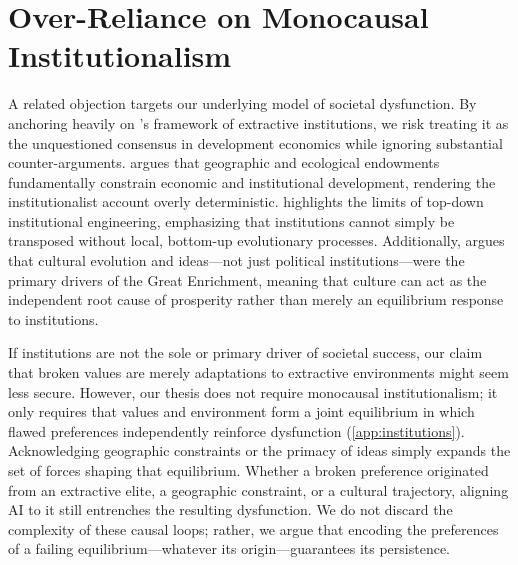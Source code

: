 \documentclass{article}
\theoremstyle{plain}
\theoremstyle{definition}
\theoremstyle{remark}
\begin{document}
\section{Over-Reliance on Monocausal Institutionalism}
\label{sec:alt-institutionalism}
A related objection targets our underlying model of societal dysfunction. By anchoring heavily on \citet{acemoglu2012why}'s framework of extractive institutions, we risk treating it as the unquestioned consensus in development economics while ignoring substantial counter-arguments. \citet{sachs2003institutions} argues that geographic and ecological endowments fundamentally constrain economic and institutional development, rendering the institutionalist account overly deterministic. \citet{easterly2006white} highlights the limits of top-down institutional engineering, emphasizing that institutions cannot simply be transposed without local, bottom-up evolutionary processes. Additionally, \citet{mokyr2016culture} argues that cultural evolution and ideas---not just political institutions---were the primary drivers of the Great Enrichment, meaning that culture can act as the independent root cause of prosperity rather than merely an equilibrium response to institutions.

If institutions are not the sole or primary driver of societal success, our claim that broken values are merely adaptations to extractive environments might seem less secure. However, our thesis does not require monocausal institutionalism; it only requires that values and environment form a joint equilibrium in which flawed preferences independently reinforce dysfunction (\cref{app:institutions}). Acknowledging geographic constraints \citep{sachs2003institutions} or the primacy of ideas \citep{mokyr2016culture} simply expands the set of forces shaping that equilibrium. Whether a broken preference originated from an extractive elite, a geographic constraint, or a cultural trajectory, aligning AI to it still entrenches the resulting dysfunction. We do not discard the complexity of these causal loops; rather, we argue that encoding the preferences of a failing equilibrium---whatever its origin---guarantees its persistence.
\end{document}
